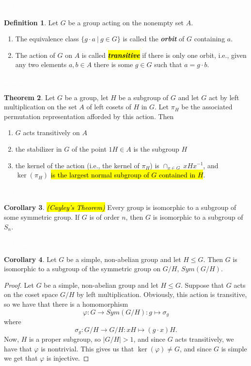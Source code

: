\documentclass{article}
\theoremstyle{definition}
\newtheorem{thm}{Theorem}[section]
\newtheorem{cor}[thm]{Corollary}
\newtheorem{defn}[thm]{Definition}
\newcommand{\nl}{\textcolor{white}{nothing}}
\newcommand{\ra}{\rightarrow}
\newcommand{\inv}{^{-1}}
\newcommand{\sig}{\sigma}
\newcommand{\vphi}{\varphi}
\begin{document}
\nl

\begin{defn}
Let $G$ be a group acting on the nonempty set $A$.
\begin{enumerate}
\item The equivalence class $\{g\cdot a\ |\ g\in G\}$ is called the \textbf{\textit{orbit}} of $G$ containing $a$.
\item The action of $G$ on $A$ is called \hl{\textbf{\textit{transitive}}} if there is only one orbit, i.e., given any two elements $a,b\in A$ there is some $g\in G$ such that $a= g\cdot b$.
\end{enumerate}
\end{defn}

\nl


\begin{thm}
Let $G$ be a group, let $H$ be a subgroup of $G$ and let $G$ act by left multiplication on the set $A$ of left cosets of $H$ in $G$. Let $\pi_H$ be the associated permutation representation afforded by this action. Then
\begin{enumerate}
\item $G$ acts transitively on $A$
\item the stabilizer in $G$ of the point $1H\in A$ is the subgroup $H$
\item the kernel of the action (i.e., the kernel of $\pi_H$) is $\cap_{x\in G}\ xHx\inv$, and $\ker(\pi_H)$ \hl{is the largest normal subgroup of $G$ contained in $H$}.
\end{enumerate}
\end{thm}

\nl

\begin{cor}\hl{\textit{(Cayley's Theorem)}}
Every group is isomorphic to a subgroup of some symmetric group. If $G$ is of order $n$, then $G$ is isomorphic to a subgroup of $S_n$.
\end{cor}

\nl

\begin{cor}
Let $G$ be a simple, non-abelian group and let $H\leq G$. Then $G$ is isomorphic to a subgroup of the symmetric group on $G/H$, $Sym(G/H)$.
\end{cor}

\begin{proof}
Let $G$ be a simple, non-abelian group and let $H\leq G$. Suppose that $G$ acts on the coset space $G/H$ by left multiplication. Obviously, this action is transitive, so we have that there is a homomorphism
\[\vphi:G \ra Sym(G/H): g\mapsto \sig_g\]
where
\[\sig_g: G/H \ra G/H: xH\mapsto (g\cdot x)H.\]
Now, $H$ is a proper subgroup, so $|G/H| > 1$, and since $G$ acts transitively, we have that $\vphi$ is nontrivial. This gives us that $\ker(\vphi) \neq G$, and since $G$ is simple we get that $\vphi$ is injective.
\end{proof}
\end{document}

